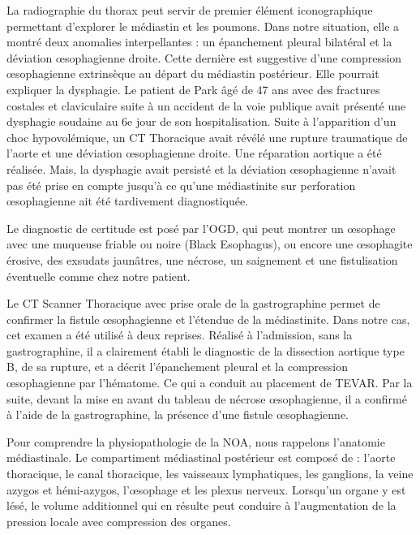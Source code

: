 \documentclass[./tfe.tex]{subfiles}
\begin{document}
La radiographie du thorax peut servir de premier élément iconographique permettant d’explorer le médiastin et les poumons. Dans notre situation, elle a montré deux anomalies interpellantes : un épanchement pleural bilatéral et la déviation œsophagienne droite. Cette dernière est suggestive d’une compression œsophagienne extrinsèque au départ du médiastin postérieur\cite{joubert_successful_2016, park_ischemic_2004}. Elle pourrait expliquer la dysphagie. Le patient de Park \cite{park_ischemic_2004} âgé de 47 ans avec des fractures costales et claviculaire suite à un accident de la voie publique avait présenté une dysphagie soudaine au 6e jour de son hospitalisation. Suite à l’apparition d’un choc hypovolémique, un CT Thoracique avait révélé une rupture traumatique de l’aorte et une déviation œsophagienne droite. Une réparation aortique a été réalisée. Mais, la dysphagie avait persisté et la déviation œsophagienne n’avait pas été prise en compte jusqu’à ce qu’une médiastinite sur perforation œsophagienne ait été tardivement diagnostiquée.

Le diagnostic de certitude est posé par l'OGD\cite{gurvits_acute_2007, abdullah_clinical_2019}, qui peut montrer un œsophage avec une muqueuse friable ou noire (Black Esophagus), ou encore une œsophagite érosive, des exsudats jaunâtres, une nécrose, un saignement et une fistulisation éventuelle comme chez notre patient.

Le CT Scanner Thoracique avec prise orale de la gastrographine permet de confirmer la fistule œsophagienne et l’étendue de la médiastinite\cite{chiesa_aorto-oesophageal_2010}. Dans notre cas, cet examen a été utilisé à deux reprises. Réalisé à l’admission, sans la gastrographine, il a clairement établi le diagnostic de la dissection aortique type B, de sa rupture, et a décrit l’épanchement pleural et la compression œsophagienne par l’hématome. Ce qui a conduit au placement de TEVAR. Par la suite, devant la mise en avant du tableau de nécrose œsophagienne, il a confirmé à l’aide de la gastrographine, la présence d’une fistule œsophagienne.

Pour comprendre la physiopathologie de la NOA, nous rappelons l’anatomie médiastinale. Le compartiment médiastinal postérieur est composé de \cite{josse_posterior_2012} : l’aorte thoracique, le canal thoracique, les vaisseaux lymphatiques, les ganglions, la veine azygos et hémi-azygos, l’œsophage et les plexus nerveux. Lorsqu’un organe y est lésé, le volume additionnel qui en résulte peut conduire à l’augmentation de la pression locale avec compression des organes.
\end{document}
